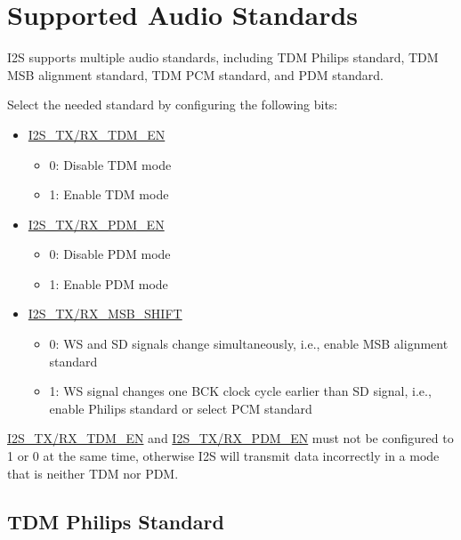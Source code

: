 \documentclass[main\_\_EN.tex]{subfiles}
\begin{document}
\section{Supported Audio Standards} \label{sec:i2s-supported-audio-standards}

\chipname{} I2S supports multiple audio standards, including TDM Philips standard, TDM MSB alignment standard, TDM PCM standard, and PDM standard.

Select the needed standard by configuring the following bits:

\begin{itemize}
    \item \hyperref[fielddesc:I2SRXMSBSHIFT]{I2S\_TX/RX\_TDM\_EN}
    \begin{itemize}
        \item 0: Disable TDM mode
        \item 1: Enable TDM mode
    \end{itemize}
    \item \hyperref[fielddesc:I2SRXMSBSHIFT]{I2S\_TX/RX\_PDM\_EN}
    \begin{itemize}
        \item 0: Disable PDM mode
        \item 1: Enable PDM mode
    \end{itemize}    
    \item \hyperref[fielddesc:I2SRXMSBSHIFT]{I2S\_TX/RX\_MSB\_SHIFT}
    \begin{itemize}
        \item 0: WS and SD signals change simultaneously, i.e., enable MSB alignment standard
        \item 1: WS signal changes one BCK clock cycle earlier than SD signal, i.e., enable Philips standard or select PCM standard
    \end{itemize}
\end{itemize}

\begin{tiplisting}
\hyperref[fielddesc:I2SRXMSBSHIFT]{I2S\_TX/RX\_TDM\_EN} and \hyperref[fielddesc:I2SRXMSBSHIFT]{I2S\_TX/RX\_PDM\_EN} must not be configured to 1 or 0 at the same time, otherwise \chipname{} I2S will transmit data incorrectly in a mode that is neither TDM nor PDM.
\end{tiplisting}

\subsection{TDM Philips Standard}
\end{document}
